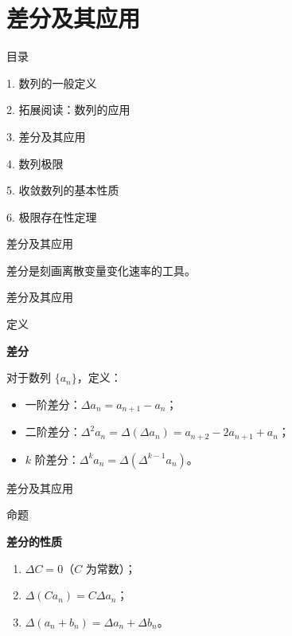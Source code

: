 \documentclass[aspectratio=169,10pt,fontset=fandol]{ctexbeamer}
\begin{document}
\section{差分及其应用}
\begin{frame}[t,fragile]{目录}
\normalsize
{\color{black}\normalsize 1. 数列的一般定义\par}\vspace{0.22em}
{\color{black}\normalsize 2. 拓展阅读：数列的应用\par}\vspace{0.22em}
{\color{blue}\normalsize 3. 差分及其应用\par}\vspace{0.22em}
{\color{gray!40}\normalsize 4. 数列极限\par}\vspace{0.22em}
{\color{gray!40}\normalsize 5. 收敛数列的基本性质\par}\vspace{0.22em}
{\color{gray!40}\normalsize 6. 极限存在性定理\par}\vspace{0.22em}
\end{frame}
\begin{frame}[t,fragile]{差分及其应用}
\normalsize
{\normalsize
差分是刻画离散变量变化速率的工具。


}
\end{frame}
\begin{frame}[t,fragile]{差分及其应用}
\normalsize
\begin{block}{定义}
{\normalsize
\textbf{差分}\par

对于数列 \(\{a_n\}\)，定义：
\begin{itemize}
\item 一阶差分：\(\Delta a_n = a_{n+1} - a_n\)；
\item 二阶差分：\(\Delta^2 a_n = \Delta(\Delta a_n) = a_{n+2} - 2a_{n+1} + a_n\)；
\item \(k\) 阶差分：\(\Delta^k a_n = \Delta(\Delta^{k-1} a_n)\)。
\end{itemize}

}
\end{block}
\end{frame}
\begin{frame}[t,fragile]{差分及其应用}
\normalsize
\begin{block}{命题}
{\normalsize
\textbf{差分的性质}\par

\begin{enumerate}
\item \(\Delta C = 0\)（\(C\) 为常数）；
\item \(\Delta(C a_n) = C \Delta a_n\)；
\item \(\Delta(a_n + b_n) = \Delta a_n + \Delta b_n\)。
\end{enumerate}

}
\end{block}
\end{frame}
\end{document}
